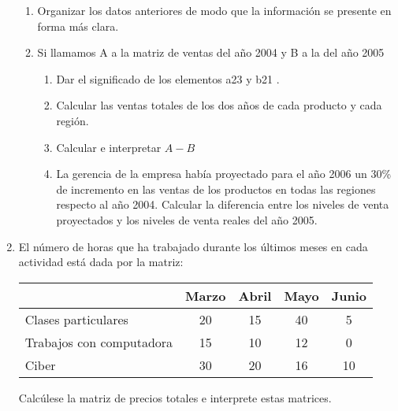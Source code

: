 \documentclass[12pt]{article}
\begin{document}
\begin{enumerate}
\begin{tabular}{ll}
\end{tabular}
\begin{enumerate}
\item Organizar los datos anteriores de modo que la información se presente en forma más clara.
\item Si llamamos A a la matriz de ventas del año 2004 y B a la del año 2005
\begin{enumerate}
  \item Dar el significado de los elementos a23 y b21 .
  \item Calcular las ventas totales de los dos años de cada producto y cada región.
  \item Calcular e interpretar $A - B$
  \item La gerencia de la empresa había proyectado para el año 2006 un 30\% de incremento en las ventas de los productos en todas las regiones respecto al año 2004. Calcular la diferencia entre los niveles de venta proyectados y los niveles
de venta reales del año 2005.
\end{enumerate}
\end{enumerate}
\item El número de horas que ha trabajado durante los últimos meses en cada actividad está dada por la matriz:
\begin{center}
\begin{tabular}{|l|c|c|c|c|}
\cline{2-5}
\multicolumn{1}{c|}{} & Marzo & Abril & Mayo & Junio \\
\hline
Clases particulares & 20 & 15 & 40 & 5 \\
\hline
Trabajos con computadora & 15 & 10 & 12 & 0 \\
\hline
Ciber & 30 & 20 & 16 & 10 \\
\hline
\end{tabular}
\end{center}
Calcúlese la matriz de precios totales e interprete estas matrices.
\end{enumerate}
\end{document}
